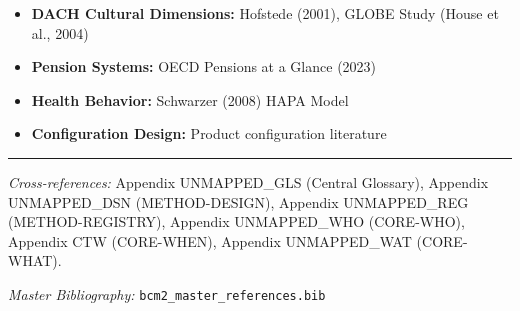 \begin{itemize}[nosep]
    \item \textbf{DACH Cultural Dimensions:} Hofstede (2001), GLOBE Study (House et al., 2004)
    \item \textbf{Pension Systems:} OECD Pensions at a Glance (2023)
    \item \textbf{Health Behavior:} Schwarzer (2008) HAPA Model
    \item \textbf{Configuration Design:} Product configuration literature
\end{itemize}

\nocite{bcm_master}



\vspace{1em}
\hrule
\vspace{0.5em}

\noindent\textit{Cross-references:}
Appendix UNMAPPED_GLS (Central Glossary),
Appendix UNMAPPED_DSN (METHOD-DESIGN),
Appendix UNMAPPED_REG (METHOD-REGISTRY),
Appendix UNMAPPED_WHO (CORE-WHO),
Appendix CTW (CORE-WHEN),
Appendix UNMAPPED_WAT (CORE-WHAT).

\noindent\textit{Master Bibliography:} \texttt{bcm2\_master\_references.bib}


